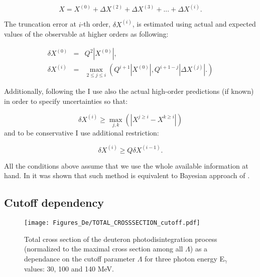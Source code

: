     \begin{equation}
        X = X^{(0)} + \Delta X^{(2)} + \Delta X^{(3)} + ... + \Delta X^{(i)}.
        \label{trunc1}
    \end{equation}
        
    The truncation error at $i$-th order, $\delta X^{(i)}$, is estimated using
    actual and expected values of the observable at 
    higher orders as following:

    \begin{eqnarray}
        \delta X^{(0)} &=& Q^2 \left| X^{(0)} \right| \label{trunc2},\\ 
        \delta X^{(i)} &=& \max_{2 \leq j \leq i} \left( Q^{i+1} \left| X^{(0)} \right|,
        Q^{i+1-j} \left| \Delta X^{(j)} \right|. \right) \label{trunc3} 
    \end{eqnarray}

    Additionally, following the \cite{Binder2015} I use also the actual high-order predictions 
    (if known) in order to specify uncertainties so that:

    \begin{equation}
        \delta X^{(i)} \geq \max_{j,k} (|X^{j \geq i} - X^{k \geq i}|)
        \label{trunc4}
    \end{equation}
    and to be conservative I use additional restriction:

    \begin{equation}
        \delta X^{(i)} \geq Q \delta X^{(i-1)}.
        \label{trunc5}
    \end{equation}

    All the conditions above assume that we use the whole available information at hand.
    In \cite{Melendez_BayesTrunc}  it was shown that such method is equivalent to Bayesian approach of \cite{Melendez_BayesTrunc}.


    \subsection*{Cutoff dependency}



    \begin{figure}[htb]
        \begin{center}
            \texttt{[image: Figures\_De/TOTAL\_CROSSSECTION\_cutoff.pdf]}
        \end{center}
        \caption{Total cross section of the deuteron photodisintegration
        process (normalized to the maximal cross section among all $\Lambda$)
        as a dependance on the cutoff parameter $\Lambda$ 
        for three photon energy E$_\gamma$ values: 30, 100 and 140 MeV.}
        \label{Cutoff_dep}
        \end{figure}

